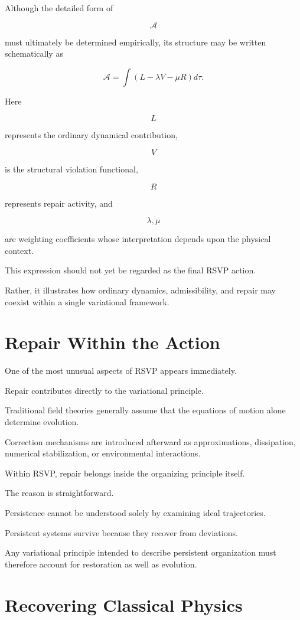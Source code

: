 \documentclass[11pt,oneside]{book}
\numberwithin{equation}{chapter}
\theoremstyle{definition}
\theoremstyle{plain}
\begin{document}
Although the detailed form of

\[
\mathcal A
\]

must ultimately be determined empirically, its structure may be written
schematically as

\[
\mathcal A
=
\int
\left(
L
-
\lambda V
-
\mu R
\right)
d\tau.
\]

Here

\[
L
\]

represents the ordinary dynamical contribution,

\[
V
\]

is the structural violation functional,

\[
R
\]

represents repair activity, and

\[
\lambda,\mu
\]

are weighting coefficients whose interpretation depends upon the physical
context.

This expression should not yet be regarded as the final RSVP action.

Rather, it illustrates how ordinary dynamics, admissibility, and repair may
coexist within a single variational framework.

\section{Repair Within the Action}

One of the most unusual aspects of RSVP appears immediately.

Repair contributes directly to the variational principle.

Traditional field theories generally assume that the equations of motion
alone determine evolution.

Correction mechanisms are introduced afterward as approximations,
dissipation, numerical stabilization, or environmental interactions.

Within RSVP, repair belongs inside the organizing principle itself.

The reason is straightforward.

Persistence cannot be understood solely by examining ideal trajectories.

Persistent systems survive because they recover from deviations.

Any variational principle intended to describe persistent organization must
therefore account for restoration as well as evolution.

\section{Recovering Classical Physics}
\end{document}
